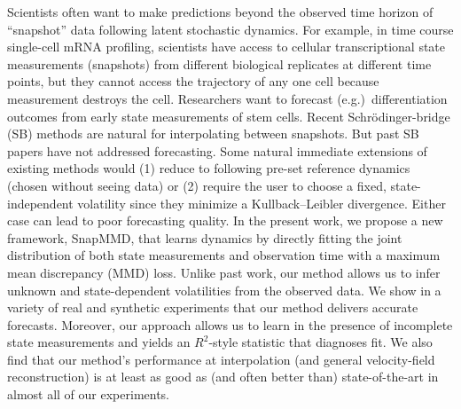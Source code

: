 Scientists often want to make predictions beyond the observed time horizon of “snapshot” data following latent stochastic dynamics. For example, in time course single-cell mRNA profiling, scientists have access to cellular transcriptional state measurements (snapshots) from different biological replicates at different time points, but they cannot access the trajectory of any one cell because  measurement destroys the cell. Researchers want to forecast (e.g.)\ differentiation outcomes from early state measurements of stem cells. Recent Schrödinger-bridge (SB) methods are natural for interpolating between snapshots. But past SB papers have not addressed forecasting. Some natural immediate extensions of existing methods would (1) reduce to following pre-set reference dynamics (chosen without seeing data) or (2) require the user to choose a fixed, state-independent volatility since they minimize a Kullback–Leibler divergence. Either case can lead to poor forecasting quality. In the present work, we propose a new framework, SnapMMD, that learns dynamics by directly fitting the joint distribution of both state measurements and observation time with a maximum mean discrepancy (MMD) loss. Unlike past work, our method allows us to infer unknown and state-dependent volatilities from the observed data. We show in a variety of real and synthetic experiments that our method delivers accurate forecasts. Moreover, our approach allows us to learn in the presence of incomplete state measurements and yields an $R^2$-style statistic that diagnoses fit. We also find that our method's performance at interpolation (and general velocity-field reconstruction) is at least as good as (and often better than) state-of-the-art in almost all of our experiments. 
